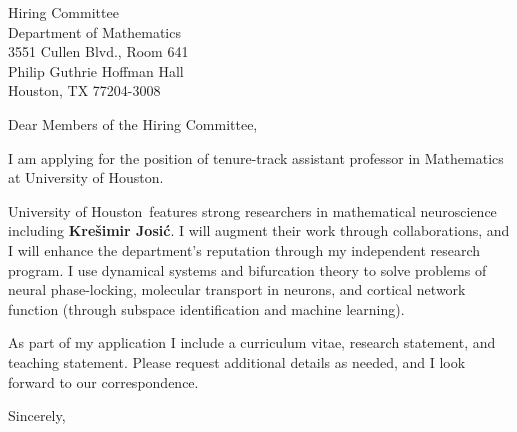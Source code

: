 \documentclass[11pt,a4paper]{letter}
\begin{document}
\def\School{University of Houston}
\begin{letter}
{Hiring Committee\\
Department of Mathematics\\
3551 Cullen Blvd., Room 641\\
Philip Guthrie Hoffman Hall\\
Houston, TX 77204-3008}


\opening{Dear Members of the Hiring Committee,}

I am applying for the position of tenure-track assistant professor in Mathematics at \School. 



\School~features strong researchers in mathematical neuroscience including \textbf{Krešimir Josić}. I will augment their work through collaborations, and I will enhance the department's reputation through my independent research program. I use dynamical systems and bifurcation theory to solve problems of neural phase-locking, molecular transport in neurons, and cortical network function (through subspace identification and machine learning).



As part of my application I include a curriculum vitae, research statement, and teaching statement. Please request additional details as needed, and I look forward to our correspondence.

\closing{Sincerely,}
\end{letter}
\end{document}
